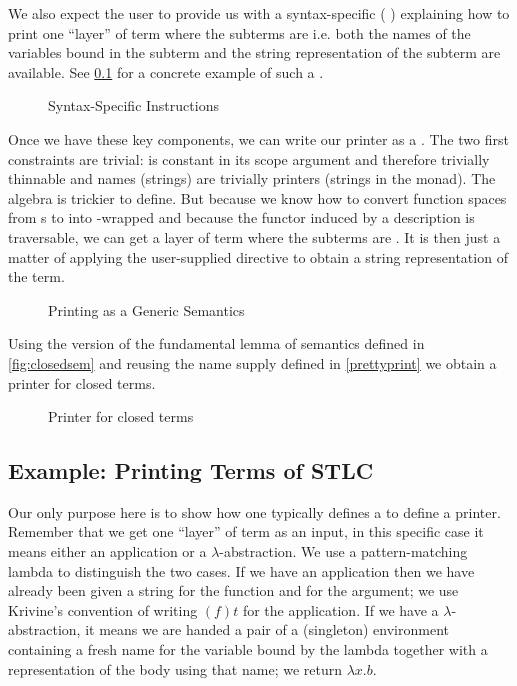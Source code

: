 We also expect the user to provide us with a syntax-specific ({ })
explaining how to print one ``layer'' of term where the subterms are  i.e.
both the names of the variables bound in the subterm and the string representation of
the subterm are available. See \cref{sec:printingexample} for a concrete example of
such a .

\begin{figure}[h]
\caption{Syntax-Specific  Instructions\label{fig:printingdisplay}}
\end{figure}

Once we have these key components, we can write our printer as a . The two
first constraints are trivial:  is constant in its scope argument and therefore
trivially thinnable and names (strings) are trivially printers (strings in the 
monad). The algebra is trickier to define. But because we know how to convert 
function spaces from s to  into -wrapped  and
because the functor induced by a description is traversable, we can get a layer of
term where the subterms are . It is then just a matter of applying the
user-supplied  directive to obtain a string representation of the term.

\begin{figure}[h]
\caption{Printing as a Generic Semantics\label{fig:genprinting}}
\end{figure}

Using the  version of the fundamental lemma of semantics defined in
\cref{fig:closedsem} and reusing the name supply defined in \cref{prettyprint}
we obtain a printer for closed terms.

\begin{figure}[h]
\caption{Printer for closed terms\label{fig:genprinter}}
\end{figure}

\subsection{Example: Printing Terms of STLC}
\label{sec:printingexample}

Our only purpose here is to show how one typically defines a  to
define a printer. Remember that we get one ``layer'' of term as an input, in this
specific case it means either an application or a $\lambda$-abstraction. We use
a pattern-matching lambda to distinguish the two cases. If we have an application
then we have already been given a string  for the function and  for the
argument; we use Krivine's convention of writing $(f)t$ for the application. If we
have a $\lambda$-abstraction, it means we are handed a pair of a (singleton) environment
containing a fresh name  for the variable bound by the lambda together with a
representation  of the body using that name; we return $\lambda{}x.b$.

